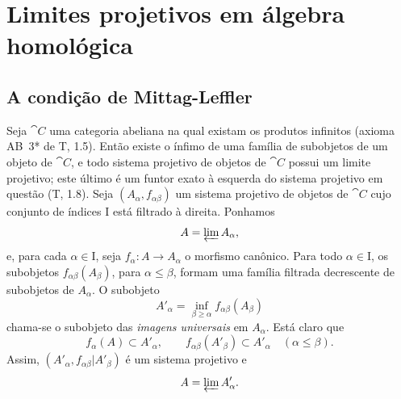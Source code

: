 \section{Limites projetivos em álgebra homológica}
\label{section:0.13}

\subsection{A condição de Mittag-Leffler}
\label{subsection:0.13.1}

\begin{env}[13.1.1]
\label{0.13.1.1}
Seja $\cat{C}$ uma categoria abeliana na qual existam os produtos
infinitos (axioma AB~3* de T, 1.5).
Então existe o ínfimo de uma família de subobjetos de um objeto de
$\cat{C}$, e todo sistema projetivo de objetos de $\cat{C}$ possui um
limite projetivo; este último é um funtor exato à esquerda do
sistema projetivo em questão (T, 1.8).
Seja $(A_\alpha,f_{\alpha\beta})$ um sistema projetivo de objetos de
$\cat{C}$ cujo conjunto de índices $\mathrm{I}$ está filtrado à direita.
Ponhamos
\[
  A=\varprojlim A_\alpha,
\]
e, para cada $\alpha\in\mathrm{I}$, seja
$f_\alpha:A\longrightarrow A_\alpha$ o morfismo canônico.
Para todo $\alpha\in\mathrm{I}$, os subobjetos
$f_{\alpha\beta}(A_\beta)$, para $\alpha\leq\beta$, formam uma família
filtrada decrescente de subobjetos de $A_\alpha$.
O subobjeto
\[
  A'_\alpha
  =
  \inf_{\beta\geq\alpha}f_{\alpha\beta}(A_\beta)
\]
chama-se o subobjeto das \emph{imagens universais} em $A_\alpha$.
Está claro que
\[
  f_\alpha(A)\subset A'_\alpha,
  \qquad
  f_{\alpha\beta}(A'_\beta)\subset A'_\alpha
  \quad(\alpha\leq\beta).
\]
Assim,
$(A'_\alpha,f_{\alpha\beta}|A'_\beta)$ é um sistema projetivo e
\[
  A=\varprojlim A'_\alpha.
\]
\end{env}

